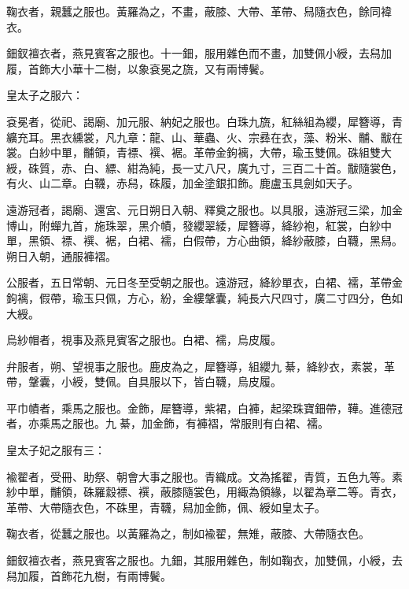 \begin{pinyinscope}
 鞠衣者，親蠶之服也。黃羅為之，不畫，蔽膝、大帶、革帶、舄隨衣色，餘同褘衣。



 鈿釵襢衣者，燕見賓客之服也。十一鈿，服用雜色而不畫，加雙佩小綬，去舄加履，首飾大小華十二樹，以象袞冕之旒，又有兩博鬢。



 皇太子之服六：



 袞冕者，從祀、謁廟、加元服、納妃之服也。白珠九旒，紅絲組為纓，犀簪導，青纊充耳。黑衣纁裳，凡九章：龍、山、華蟲、火、宗彞在衣，藻、粉米、黼、黻在裳。白紗中單，黼領，青褾、襈、裾。革帶金鉤褵，大帶，瑜玉雙佩。硃組雙大綬，硃質，赤、白、縹、紺為純，長一丈八尺，廣九寸，三百二十首。黻隨裳色，有火、山二章。白韈，赤舄，硃履，加金塗銀扣飾。鹿盧玉具劍如天子。



 遠游冠者，謁廟、還宮、元日朔日入朝、釋奠之服也。以具服，遠游冠三梁，加金博山，附蟬九首，施珠翠，黑介幘，發纓翠緌，犀簪導，絳紗袍，紅裳，白紗中單，黑領、褾、襈、裾，白裙、襦，白假帶，方心曲領，絳紗蔽膝，白韈，黑舄。朔日入朝，通服褲褶。



 公服者，五日常朝、元日冬至受朝之服也。遠游冠，絳紗單衣，白裙、襦，革帶金鉤褵，假帶，瑜玉只佩，方心，紛，金縷鞶囊，純長六尺四寸，廣二寸四分，色如大綬。



 烏紗帽者，視事及燕見賓客之服也。白裙、襦，烏皮履。



 弁服者，朔、望視事之服也。鹿皮為之，犀簪導，組纓九綦，絳紗衣，素裳，革帶，鞶囊，小綬，雙佩。自具服以下，皆白韈，烏皮履。



 平巾幘者，乘馬之服也。金飾，犀簪導，紫裙，白褲，起梁珠寶鈿帶，鞾。進德冠者，亦乘馬之服也。九綦，加金飾，有褲褶，常服則有白裙、襦。



 皇太子妃之服有三：



 褕翟者，受冊、助祭、朝會大事之服也。青織成。文為搖翟，青質，五色九等。素紗中單，黼領，硃羅縠褾、襈，蔽膝隨裳色，用緅為領緣，以翟為章二等。青衣，革帶、大帶隨衣色，不硃里，青韈，舄加金飾，佩、綬如皇太子。



 鞠衣者，從蠶之服也。以黃羅為之，制如褕翟，無雉，蔽膝、大帶隨衣色。



 鈿釵襢衣者，燕見賓客之服也。九鈿，其服用雜色，制如鞠衣，加雙佩，小綬，去舄加履，首飾花九樹，有兩博鬢。




\end{pinyinscope}
